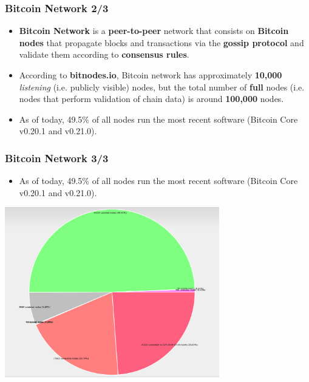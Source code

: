\documentclass{beamer}
\begin{document}
\begin{frame}
  \frametitle{Bitcoin Network 2/3}
  \begin{itemize}
  \item \textbf{Bitcoin Network} is a \textbf{peer-to-peer} network that
    consists on \textbf{Bitcoin nodes} that propagate blocks and transactions
    via the \textbf{gossip protocol} and validate them according to
    \textbf{consensus rules}.
  \item According to \textbf{bitnodes.io}, Bitcoin network has approximately
    \textbf{10,000} \textit{listening} (i.e. publicly visible) nodes, but the
    total number of \textbf{full} nodes (i.e. nodes that perform validation of
    chain data) is around \textbf{100,000} nodes.
  \item As of today, 49.5\% of all nodes run the most recent software (Bitcoin
    Core v0.20.1 and v0.21.0).
  \end{itemize}
\end{frame}

\begin{frame}
  \frametitle{Bitcoin Network 3/3}
  \begin{itemize}
  \item As of today, 49.5\% of all nodes run the most recent software (Bitcoin
    Core v0.20.1 and v0.21.0).
  \end{itemize}
  \begin{center}
    \includegraphics[width=0.7\textwidth]{nodes}
  \end{center}
\end{frame}
\end{document}
